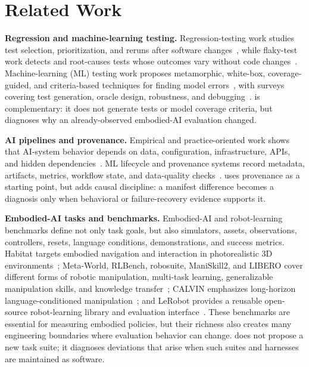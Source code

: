 \section{Related Work}
\label{sec:related-work}

\noindent\textbf{Regression and machine-learning testing.}
Regression-testing work studies test selection, prioritization, and reruns after software changes~\cite{yoo2012regression}, while flaky-test work detects and root-causes tests whose outcomes vary without code changes~\cite{luo2014flaky,bell2018deflaker,lam2019root}. Machine-learning (ML) testing work proposes metamorphic, white-box, coverage-guided, and criteria-based techniques for finding model errors~\cite{xie2011metamorphic,pei2017deepxplore}, with surveys covering test generation, oracle design, robustness, and debugging~\cite{zhang2022mltesting,braiek2020testing}. \sys is complementary: it does not generate tests or model coverage criteria, but diagnoses why an already-observed embodied-AI evaluation changed.

\noindent\textbf{AI pipelines and provenance.}
Empirical and practice-oriented work shows that AI-system behavior depends on data, configuration, infrastructure, APIs, and hidden dependencies~\cite{zhang2018tensorflowbugs,humbatova2020faults,amershi2019se4ml,martinezfernandez2022survey,breck2017mltest,sculley2015debt}. ML lifecycle and provenance systems record metadata, artifacts, metrics, workflow state, and data-quality checks~\cite{baylor2017tfx,zaharia2018mlflow,schelter2018deequ,moreau2011opm}. \sys uses provenance as a starting point, but adds causal discipline: a manifest difference becomes a diagnosis only when behavioral or failure-recovery evidence supports it.

\noindent\textbf{Embodied-AI tasks and benchmarks.}
Embodied-AI and robot-learning benchmarks define not only task goals, but also simulators, assets, observations, controllers, resets, language conditions, demonstrations, and success metrics. Habitat targets embodied navigation and interaction in photorealistic 3D environments~\cite{savva2019habitat}; Meta-World, RLBench, robosuite, ManiSkill2, and LIBERO cover different forms of robotic manipulation, multi-task learning, generalizable manipulation skills, and knowledge transfer~\cite{yu2020metaworld,james2020rlbench,zhu2020robosuite,gu2023maniskill2,liu2023libero}; CALVIN emphasizes long-horizon language-conditioned manipulation~\cite{mees2022calvin}; and LeRobot provides a reusable open-source robot-learning library and evaluation interface~\cite{lerobot2026}. These benchmarks are essential for measuring embodied policies, but their richness also creates many engineering boundaries where evaluation behavior can change. \sys does not propose a new task suite; it diagnoses deviations that arise when such suites and harnesses are maintained as software.

